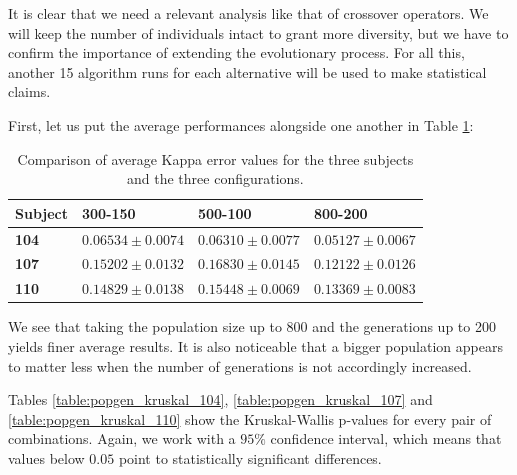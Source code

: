 	It is clear that we need a relevant analysis like that of crossover operators. We will keep the number of individuals intact to grant more diversity, but we have to confirm the importance of extending the evolutionary process. For all this, another 15 algorithm runs for each alternative will be used to make statistical claims.

	First, let us put the average performances alongside one another in Table \ref{table:popgen_kappa}:

	\vspace{0.3cm}

	\begin{table}[h]

        \centering
        \setlength\arrayrulewidth{0.8pt}

        \begin{tabular}{| >{\centering\arraybackslash}m{0.5in} | >{\centering\arraybackslash}m{1.1in} | >{\centering\arraybackslash}m{1.1in} | >{\centering\arraybackslash}m{1.1in} |}

            \hline
            \rowcolor{RoyalBlue}
            \textbf{Subject} & \textbf{300-150} & \textbf{500-100} & \textbf{800-200} \\
            \hline
            \cellcolor{RoyalBlue}\textbf{104} & $0.06534 \pm 0.0074$ & $0.06310 \pm 0.0077$ & $0.05127 \pm 0.0067$ \\
            \hline
            \cellcolor{RoyalBlue}\textbf{107} & $0.15202 \pm 0.0132$ & $0.16830 \pm 0.0145$ & $0.12122 \pm 0.0126$ \\
            \hline
            \cellcolor{RoyalBlue}\textbf{110} & $0.14829 \pm 0.0138$ & $0.15448 \pm 0.0069$ & $0.13369 \pm 0.0083$ \\
            \hline

        \end{tabular}

        \caption{Comparison of average Kappa error values for the three subjects and the three configurations.}\label{table:popgen_kappa}

    \end{table}

    We see that taking the population size up to 800 and the generations up to 200 yields finer average results. It is also noticeable that a bigger population appears to matter less when the number of generations is not accordingly increased.

\newpage

    Tables \ref{table:popgen_kruskal_104}, \ref{table:popgen_kruskal_107} and \ref{table:popgen_kruskal_110} show the Kruskal-Wallis p-values for every pair of combinations. Again, we work with a $95\%$ confidence interval, which means that values below $0.05$ point to statistically significant differences.

